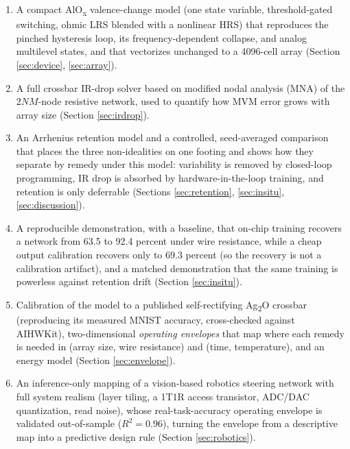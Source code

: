 \documentclass[conference]{IEEEtran}
\begin{document}
\begin{enumerate}
\item A compact AlO\textsubscript{x} valence-change model (one state variable,
threshold-gated switching, ohmic LRS blended with a nonlinear HRS) that
reproduces the pinched hysteresis loop, its frequency-dependent collapse, and
analog multilevel states, and that vectorizes unchanged to a 4096-cell array
(Section \ref{sec:device}, \ref{sec:array}).
\item A full crossbar IR-drop solver based on modified nodal analysis (MNA) of
the $2NM$-node resistive network, used to quantify how MVM error grows with array
size (Section \ref{sec:irdrop}).
\item An Arrhenius retention model and a controlled, seed-averaged comparison
that places the three non-idealities on one footing and shows how they separate
by remedy under this model: variability is removed by closed-loop programming, IR
drop is absorbed by hardware-in-the-loop training, and retention is only
deferrable (Sections \ref{sec:retention}, \ref{sec:insitu}, \ref{sec:discussion}).
\item A reproducible demonstration, with a baseline, that on-chip training
recovers a network from 63.5 to 92.4 percent under wire resistance, while a cheap
output calibration recovers only to 69.3 percent (so the recovery is not a
calibration artifact), and a matched demonstration that the same training is
powerless against retention drift (Section \ref{sec:insitu}).
\item Calibration of the model to a published self-rectifying Ag\textsubscript{2}O
crossbar \cite{keshari2026} (reproducing its measured MNIST accuracy, cross-checked
against AIHWKit), two-dimensional \emph{operating envelopes} that map where each
remedy is needed in (array size, wire resistance) and (time, temperature), and an
energy model (Section \ref{sec:envelope}).
\item An inference-only mapping of a vision-based robotics steering network with
full system realism (layer tiling, a 1T1R access transistor, ADC/DAC
quantization, read noise), whose real-task-accuracy operating envelope is
validated out-of-sample ($R^2=0.96$), turning the envelope from a descriptive map
into a predictive design rule (Section \ref{sec:robotics}).
\end{enumerate}
\end{document}
